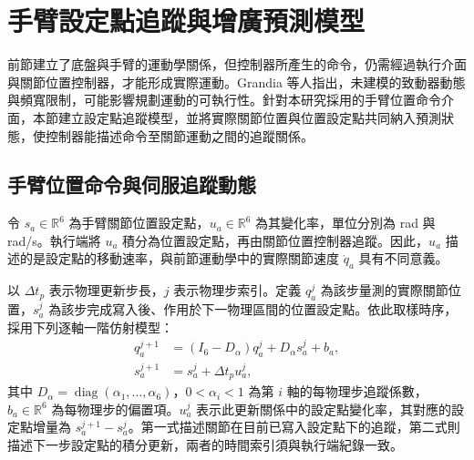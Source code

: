 
\section{手臂設定點追蹤與增廣預測模型}
\label{sec:arm_augmented_prediction}

前節建立了底盤與手臂的運動學關係，但控制器所產生的命令，仍需經過執行介面與關節位置控制器，才能形成實際運動。Grandia 等人\cite{grandia2019frequency}指出，未建模的致動器動態與頻寬限制，可能影響規劃運動的可執行性。針對本研究採用的手臂位置命令介面，本節建立設定點追蹤模型，並將實際關節位置與位置設定點共同納入預測狀態，使控制器能描述命令至關節運動之間的追蹤關係。

\subsection{手臂位置命令與伺服追蹤動態}
\label{subsec:arm_setpoint_servo}

令 $s_a\in\mathbb{R}^{6}$ 為手臂關節位置設定點，$u_a\in\mathbb{R}^{6}$ 為其變化率，單位分別為 rad 與 rad/s。執行端將 $u_a$ 積分為位置設定點，再由關節位置控制器追蹤。因此，$u_a$ 描述的是設定點的移動速率，與前節運動學中的實際關節速度 $\dot{q}_a$ 具有不同意義。

以 $\Delta t_p$ 表示物理更新步長，$j$ 表示物理步索引。定義 $q_a^{j}$ 為該步量測的實際關節位置，$s_a^{j}$ 為該步完成寫入後、作用於下一物理區間的位置設定點。依此取樣時序，採用下列逐軸一階仿射模型：
\begin{equation}
    \begin{aligned}
        q_a^{j+1}
        &= (I_6-D_{\alpha})q_a^{j}
           +D_{\alpha}s_a^{j}+b_a, \\
        s_a^{j+1}
        &= s_a^{j}+\Delta t_p u_a^{j},
    \end{aligned}
    \label{eq:ch3_physics_step_arm_model}
\end{equation}
其中 $D_{\alpha}=\operatorname{diag}(\alpha_1,\ldots,\alpha_6)$，$0<\alpha_i<1$ 為第 $i$ 軸的每物理步追蹤係數，$b_a\in\mathbb{R}^{6}$ 為每物理步的偏置項。$u_a^{j}$ 表示此更新關係中的設定點變化率，其對應的設定點增量為 $s_a^{j+1}-s_a^{j}$。第一式描述關節在目前已寫入設定點下的追蹤，第二式則描述下一步設定點的積分更新，兩者的時間索引須與執行端紀錄一致。

